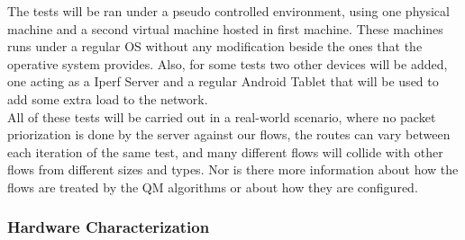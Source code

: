 The tests will be ran under a pseudo controlled environment, using one physical 
machine and a second virtual machine hosted in first machine. These machines 
runs under a regular OS without any modification beside the ones that the 
operative system provides. Also, for some tests two other devices will be added, 
one acting as a Iperf Server and a regular Android Tablet that will be used to 
add some extra load to the network.\\

All of these tests will be carried out in a real-world scenario, where no packet 
priorization is done by the server against our flows, the routes can vary
between each iteration of the same test, and many different flows will collide
with other flows from different sizes and types. Nor is there more information 
about how the flows are treated by the QM algorithms or about how they are 
configured.\\

\subsubsection{Hardware Characterization}

